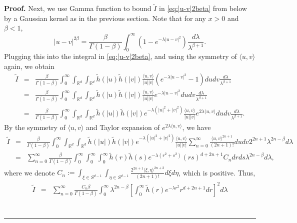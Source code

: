 \documentclass[]{elsarticle}
\newenvironment{proof}[1][Proof]{\noindent\textbf{#1.} }{\ \rule{0.5em}{0.5em}}
\numberwithin{equation}{section}
\numberwithin{theorem}{section}
\newcommand\RR{{\mathbb R}}
\begin{document}
\begin{proof}
Next, we use Gamma function to bound %
$\widetilde I $ in \eqref{eq:|u-v|2beta} from below by a Gaussian kernel as in the previous section. 
Note that for any $x>0$ and $\beta< 1$, %
\[
|u-v|^{2\beta} = \frac{\beta}{\Gamma(1-\beta)}\int_0^{\infty}(1-e^{-\lambda |u-v|^{2}})\frac{d\lambda}{\lambda^{\beta+1}}.
\]
Plugging this into the integral in \eqref{eq:|u-v|2beta}, and using the symmetry of $\langle u,v\rangle$ again, we obtain
\begin{eqnarray*}
\widetilde I  &= & \frac{\beta}{\Gamma(1-\beta)}\int_0^{\infty}\int_{\RR^d}\int_{\RR^d}\widetilde h(|u)\widetilde h(|v|)\frac{\langle u,v \rangle}{|u||v|}(e^{-\lambda|u-v|^2}-1)dudv \frac{d\lambda}{\lambda^{\beta+1}}\\
&=&\frac{\beta}{\Gamma(1-\beta)}\int_0^{\infty}\int_{\RR^d}\int_{\RR^d}\widetilde h(|u)\widetilde h(|v|)\frac{\langle u,v \rangle}{|u||v|}e^{-\lambda|u-v|^2}dudv \frac{d\lambda}{\lambda^{\beta+1}}
\\ &=&\frac{\beta}{\Gamma(1-\beta)}\int_0^{\infty}\int_{\RR^d}\int_{\RR^d}\widetilde h(|u|) \widetilde h(|v|) e^{-\lambda (|u|^2 +|v|^2) } \frac{\langle u,v \rangle}{|u||v|} e^{2\lambda \langle u,v \rangle }dudv \frac{d\lambda}{\lambda^{\beta+1}}.
\end{eqnarray*}
By the symmetry of $\langle u,v\rangle $ and Taylor expansion of $e^{2\lambda \langle u,v \rangle }$, we have
\begin{eqnarray*}
\widetilde I  &= & \frac{\beta}{\Gamma(1-\beta)}\int_0^{\infty}\int_{\RR^d}\int_{\RR^d}\widetilde h(|u|) \widetilde h(|v|)e^{-\lambda (|u|^2 +|v|^2) }  \frac{\langle u,v \rangle}{|u||v|}\sum_{n=0}^{\infty}\frac{\langle u,v \rangle^{2n+1}}{(2n+1)!}dudv 2^{2n+1}\lambda^{2n-\beta}d\lambda \\
&=& \sum_{n=0}^{\infty}\frac{\beta}{\Gamma(1-\beta)}\int_0^{\infty}\int_{0}^{\infty}\int_{0}^{\infty}\widetilde h(r) \widetilde h(s) e^{-\lambda (r^2 +s^2) }(rs)^{d+2n+1} C_n dr ds \lambda^{2n-\beta} d\lambda,
\end{eqnarray*}
where we denote $C_n := \int_{\xi\in S^{d-1}}\int_{\eta\in S^{d-1}}\frac{2^{2n+1}\langle \xi,\eta \rangle^{2n+2}}{(2n+1)!} d\xi d\eta$, 
which is positive. Thus,
\begin{eqnarray*}
\widetilde I  &= &\sum_{n=0}^{\infty}\frac{C_n\beta}{\Gamma(1-\beta)}\int_0^{\infty}\lambda^{2n-\beta}\left[\int_{0}^{\infty}\widetilde h(r)e^{-\lambda r^2 } r^{d+2n+1}dr\right]^2 d\lambda\\ 

\end{eqnarray*}
\end{proof}
\end{document}

